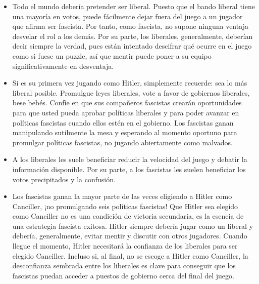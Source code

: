 \documentclass[13pt,a4paper,twocolumn,titlepage]{scrartcl}
\begin{document}
	\begin{itemize}
		\item \textcolor{Blue3}{Todo el mundo debería pretender ser \textcolor{liberal}{liberal}.} Puesto que el bando \textcolor{liberal}{liberal} tiene una mayoría en votos, puede fácilmente dejar fuera del juego a un jugador que afirma ser \textcolor{fascist}{fascista}. Por tanto, como \textcolor{fascist}{fascista}, no supone ninguna ventaja desvelar el rol a los demás. Por su parte, los \textcolor{liberal}{liberales}, generalmente, deberían decir siempre la verdad, pues están intentado descifrar qué ocurre en el juego como si fuese un puzzle, así que mentir puede poner a su equipo significativamente en desventaja.
		
		\item \textcolor{Blue3}{Si es su primera vez jugando como \textcolor{fascist}{Hitler}, simplemente recuerde: sea lo más \textcolor{liberal}{liberal} posible.} Promulgue leyes \textcolor{liberal}{liberales}, vote a favor de gobiernos \textcolor{liberal}{liberales}, bese bebés. Confíe en que sus compañeros  \textcolor{fascist}{fascistas} crearán oportunidades para que usted pueda aprobar políticas \textcolor{liberal}{liberales} y para poder avanzar en políticas \textcolor{fascist}{fascistas} cuando ellos estén en el gobierno. Los \textcolor{fascist}{fascistas} ganan manipulando sutilmente la mesa y esperando al momento oportuno para promulgar políticas \textcolor{fascist}{fascistas}, no jugando abiertamente como malvados.
		
		\item \textcolor{Blue3}{A los \textcolor{liberal}{liberales} les suele beneficiar reducir la velocidad del juego y debatir la información disponible.} Por su parte, a los \textcolor{fascist}{fascistas} les suelen beneficiar los votos precipitados y la confusión.
		
		\item \textcolor{Blue3}{Los \textcolor{fascist}{fascistas} ganan la mayor parte de las veces eligiendo a \textcolor{fascist}{Hitler} como Canciller, ¡no promulgando seis políticas fascistas!} Que \textcolor{fascist}{Hitler} sea elegido como Canciller no es una condición de victoria secundaria, es la esencia de una estrategia \textcolor{fascist}{fascista} exitosa. \textcolor{fascist}{Hitler} siempre debería jugar como un \textcolor{liberal}{liberal} y debería, generalmente, evitar mentir y discutir con otros jugadores. Cuando llegue el momento, \textcolor{fascist}{Hitler} necesitará la confianza de los \textcolor{liberal}{liberales} para ser elegido Canciller. Incluso si, al final, no se escoge a \textcolor{fascist}{Hitler} como Canciller, la desconfianza sembrada entre los \textcolor{liberal}{liberales} es clave para conseguir que los \textcolor{fascist}{fascistas} puedan acceder a puestos de gobierno cerca del final del juego.
		

\end{itemize}
\end{document}

